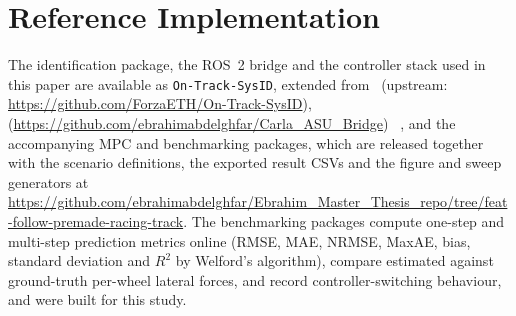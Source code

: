 \section{Reference Implementation}
\label{sec:refimpl}

The identification package, the ROS~2 bridge and the controller stack used in
this paper are available as \texttt{On-Track-SysID}, extended
from~\cite{ontrack2025} (upstream:
\url{https://github.com/ForzaETH/On-Track-SysID}), \bridge{}
(\url{https://github.com/ebrahimabdelghfar/Carla_ASU_Bridge})%
~\cite{carlaasubridge}, and the accompanying MPC and benchmarking packages,
which are released together with the scenario definitions, the exported result
CSVs and the figure and sweep generators at
\url{https://github.com/ebrahimabdelghfar/Ebrahim_Master_Thesis_repo/tree/feat-follow-premade-racing-track}. The benchmarking packages compute one-step and multi-step
prediction metrics online (RMSE, MAE, NRMSE, MaxAE, bias, standard deviation
and $R^{2}$ by Welford's algorithm), compare estimated against ground-truth
per-wheel lateral forces, and record controller-switching behaviour, and were
built for this study.
